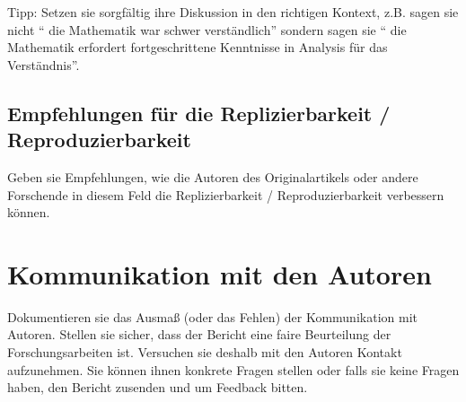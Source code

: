 \documentclass[DIV=13,fontsize=11pt]{scrartcl}
\begin{document}

Tipp: Setzen sie sorgfältig ihre Diskussion in den richtigen Kontext, z.B. sagen sie nicht `` die Mathematik war schwer verständlich'' sondern sagen sie `` die Mathematik erfordert fortgeschrittene Kenntnisse in Analysis für das Verständnis''.


\subsection{Empfehlungen für die Replizierbarkeit / Reproduzierbarkeit}
Geben sie Empfehlungen, wie die Autoren des Originalartikels oder andere Forschende in diesem Feld die Replizierbarkeit / Reproduzierbarkeit verbessern können.


\section{Kommunikation mit den Autoren}
Dokumentieren sie das Ausmaß (oder das Fehlen) der Kommunikation mit Autoren.
Stellen sie sicher, dass der Bericht eine faire Beurteilung der Forschungsarbeiten ist. Versuchen sie deshalb mit den Autoren Kontakt aufzunehmen.
Sie können ihnen konkrete Fragen stellen oder falls sie keine Fragen haben, den Bericht zusenden und um Feedback bitten.

\end{document}
